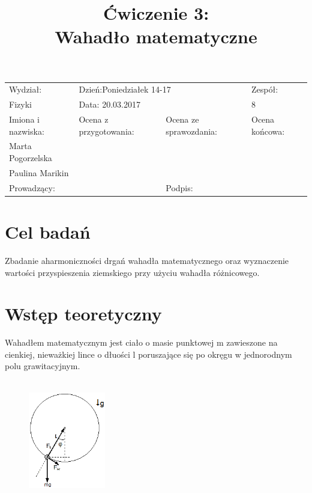 \documentclass[a4paper,10pt]{article}
\def\arraystretch{1.2}
\begin{document}
\begin{table}
  \centering
  \def\arraystretch{1.5}
    \begin{tabular}{|l|l|l|l|} \hline
    Wydział:           & \multicolumn{2}{l|}{Dzień:Poniedziałek 14-17}    &Zespół:  \\
    Fizyki             &    \multicolumn{2}{l|}{Data: 20.03.2017}         &8             \\\hline
    Imiona i nazwiska: &Ocena z przygotowania:  &Ocena ze sprawozdania:   &Ocena końcowa: \\
    Marta Pogorzelska  &                        &                         &                \\
    Paulina Marikin    &                        &                         &\\\hline
    \multicolumn{2}{|l|}{Prowadzący:                 } &\multicolumn{2}{l|}{Podpis:             }  \\\hline
  \end{tabular}
\end{table}


\title{Ćwiczenie 3:\\Wahadło matematyczne}
\date{}
\maketitle{}

\section{Cel badań}
Zbadanie aharmoniczności drgań wahadła matematycznego oraz wyznaczenie wartości przyspieszenia ziemskiego przy użyciu wahadła różnicowego.

\section{Wstęp teoretyczny}
Wahadłem matematycznym jest ciało o masie punktowej m zawieszone na cienkiej, nieważkiej lince o dłuości l poruszające się po okręgu w jednorodnym polu grawitacyjnym.
\\
\\
\begin{figure}[H]
\centering
\includegraphics[width=0.3\textwidth]{wahadlo.png}
\end{figure}
\end{document}
